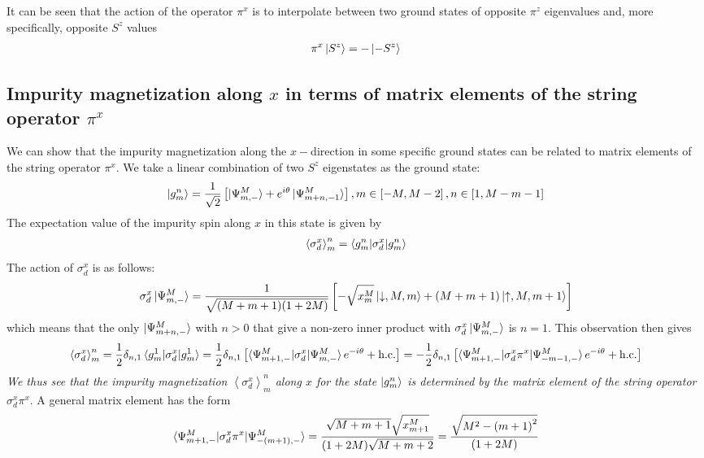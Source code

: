 \documentclass[12pt]{revtex4-2}
\begin{document}
It can be seen that the action of the operator \(\pi^x\) is to interpolate between two ground states of opposite \(\pi^z\) eigenvalues and, more specifically, opposite \(S^z\) values
\begin{align}
	\pi^x \ket{S^z} = -\ket{-S^z}
\end{align}

\subsection{Impurity magnetization along \(x\) in terms of matrix elements of the string operator \(\pi^x\)}
We can show that the impurity magnetization along the \(x-\)direction in some specific ground states can be related to matrix elements of the string operator \(\pi^x\). We take a linear combination of two \(S^z\) eigenstates as the ground state:
\begin{align}
	\ket{g^n_m} = \frac{1}{\sqrt 2}\left[\ket{\Psi^M_{m,-}} + e^{i\theta}\ket{\Psi^M_{m+n,-1}}\right], m \in \left[-M, M-2\right] , n \in \left[1, M - m - 1\right] 
\end{align}
The expectation value of the impurity spin along \(x\) in this state is given by
\begin{align}
	\left<\sigma^x_d\right>_m^n = \braket{g^n_m | \sigma_d^x | g^n_m}
\end{align}
The action of \(\sigma_d^x\) is as follows:
\begin{align}
	\sigma_d^x \ket{\Psi^M_{m,-}} = \frac{1}{\sqrt{(M+m+1)(1+2M)}}\left[-\sqrt{x_m^M}\ket{\downarrow, M, m} + \left(M + m + 1\right)\ket{\uparrow,M,m+1}\right]
\end{align}
which means that the only \(\ket{\Psi^M_{m+n,-}}\) with \(n > 0\) that give a non-zero inner product with \(\sigma_d^x \ket{\Psi^M_{m,-}}\) is \(n=1\). This observation then gives
\begin{align}
	\left<\sigma^x_d\right>_m^n =\frac{1}{2}\delta_{n,1}\braket{g^1_m | \sigma_d^x | g^1_m} = \frac{1}{2}\delta_{n,1}\left[\braket{\Psi^M_{m+1,-}|\sigma_d^x| \Psi^M_{m,-}}e^{-i\theta} + \text{h.c.}\right] = -\frac{1}{2}\delta_{n,1}\left[\braket{\Psi^M_{m+1,-}|\sigma_d^x \pi^x | \Psi^M_{-m-1,-}}e^{-i\theta} + \text{h.c.}\right]
\end{align}
\textit{We thus see that the impurity magnetization \(\left<\sigma^x_d\right>_m^n\) along \(x\) for the state \(\ket{g^n_m}\) is determined by the matrix element of the string operator \(\sigma^x_d \pi^x\)}. A general matrix element has the form
\begin{equation}\begin{aligned}
	\braket{\Psi^M_{m+1,-}|\sigma^x_d \pi^x | \Psi^M_{-(m+1),-}} = \frac{\sqrt{M + m +1}\sqrt{x^M_{m+1}}}{(1+2M)\sqrt{M+m+2}} = \frac{\sqrt{M^2 - \left(m+1\right)^2}}{\left(1+2M\right)}
\end{aligned}\end{equation}
\end{document}
